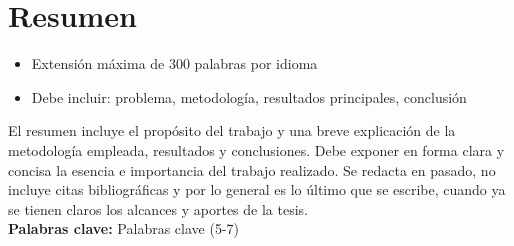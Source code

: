 \chapter{Resumen}
\begin{itemize}
    \item Extensión máxima de 300 palabras por idioma
    \item Debe incluir: problema, metodología, resultados principales, conclusión 
    
\end{itemize}

El resumen incluye el propósito del trabajo y una breve explicación de la metodología empleada, resultados y conclusiones. Debe exponer en forma clara y concisa la esencia e importancia del trabajo realizado. Se redacta en pasado, no incluye citas bibliográficas y por lo general es lo último que se escribe, cuando ya se tienen claros los alcances y aportes de la tesis.\\



\textbf{Palabras clave:} Palabras clave (5-7)